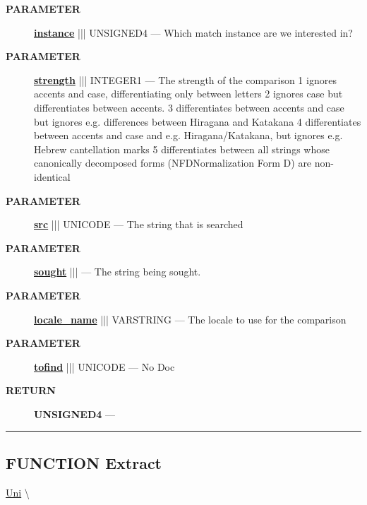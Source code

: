 \par
\begin{description}
\item [\colorbox{tagtype}{\color{white} \textbf{\textsf{PARAMETER}}}] \textbf{\underline{instance}} ||| UNSIGNED4 --- Which match instance are we interested in?
\item [\colorbox{tagtype}{\color{white} \textbf{\textsf{PARAMETER}}}] \textbf{\underline{strength}} ||| INTEGER1 --- The strength of the comparison 1 ignores accents and case, differentiating only between letters 2 ignores case but differentiates between accents. 3 differentiates between accents and case but ignores e.g. differences between Hiragana and Katakana 4 differentiates between accents and case and e.g. Hiragana/Katakana, but ignores e.g. Hebrew cantellation marks 5 differentiates between all strings whose canonically decomposed forms (NFDNormalization Form D) are non-identical
\item [\colorbox{tagtype}{\color{white} \textbf{\textsf{PARAMETER}}}] \textbf{\underline{src}} ||| UNICODE --- The string that is searched
\item [\colorbox{tagtype}{\color{white} \textbf{\textsf{PARAMETER}}}] \textbf{\underline{sought}} |||  --- The string being sought.
\item [\colorbox{tagtype}{\color{white} \textbf{\textsf{PARAMETER}}}] \textbf{\underline{locale\_name}} ||| VARSTRING --- The locale to use for the comparison
\item [\colorbox{tagtype}{\color{white} \textbf{\textsf{PARAMETER}}}] \textbf{\underline{tofind}} ||| UNICODE --- No Doc
\end{description}







\par
\begin{description}
\item [\colorbox{tagtype}{\color{white} \textbf{\textsf{RETURN}}}] \textbf{UNSIGNED4} --- 
\end{description}




\rule{\linewidth}{0.5pt}
\subsection*{\textsf{\colorbox{headtoc}{\color{white} FUNCTION}
Extract}}

\hypertarget{ecldoc:uni.extract}{}
\hspace{0pt} \hyperlink{ecldoc:Uni}{Uni} \textbackslash 


